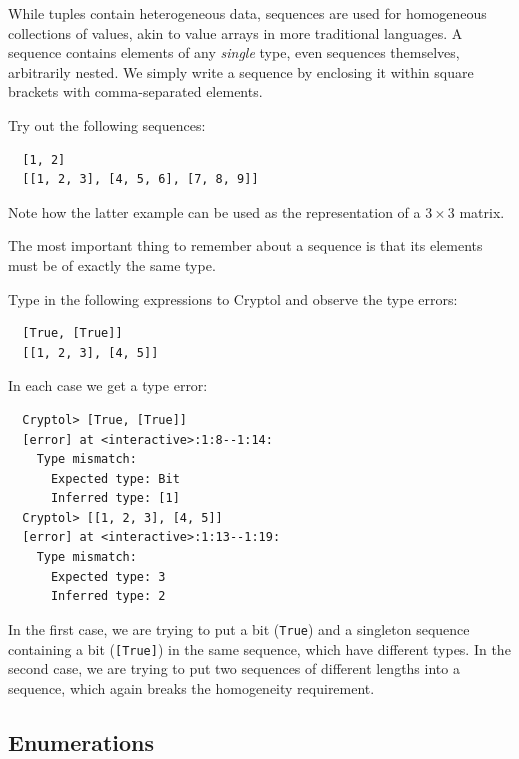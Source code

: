 While tuples contain heterogeneous data, sequences are used for
homogeneous collections of values, akin to value arrays in more
traditional languages.  A sequence contains elements of any
\emph{single} type, even sequences themselves, arbitrarily nested.  We
simply write a sequence by enclosing it within square brackets with
comma-separated elements.\indTheSequenceType


\begin{Exercise}\label{ex:seq:1}
Try out the following sequences:
\begin{Verbatim}
  [1, 2]
  [[1, 2, 3], [4, 5, 6], [7, 8, 9]]
\end{Verbatim}
Note how the latter example can be used as the representation of a
$3\times3$ matrix.
\end{Exercise}

\begin{tip}
  The most important thing to remember about a sequence is that its
  elements must be of exactly the same type.
\end{tip}

\begin{Exercise}\label{ex:seq:2}
  Type in the following expressions to Cryptol and observe the
  type errors:
\begin{Verbatim}
  [True, [True]]
  [[1, 2, 3], [4, 5]]
\end{Verbatim}
\end{Exercise}
\begin{Answer}
In each case we get a type error:
\begin{Verbatim}
  Cryptol> [True, [True]]
  [error] at <interactive>:1:8--1:14:
    Type mismatch:
      Expected type: Bit
      Inferred type: [1]
  Cryptol> [[1, 2, 3], [4, 5]]
  [error] at <interactive>:1:13--1:19:
    Type mismatch:
      Expected type: 3
      Inferred type: 2
\end{Verbatim}
In the first case, we are trying to put a bit (\texttt{True}) and a
singleton sequence containing a bit (\texttt{[True]}) in the same
sequence, which have different types. In the second case, we are
trying to put two sequences of different lengths into a sequence,
which again breaks the homogeneity requirement.
\end{Answer}

\subsection{Enumerations}\indEnum
\label{sec:enumerations}

